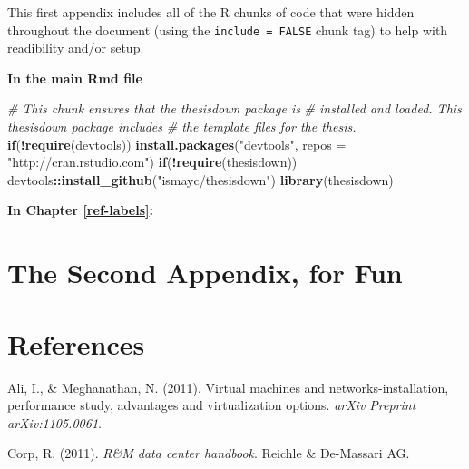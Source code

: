 \documentclass[12pt,twoside]{reedthesis}
\newenvironment{Shaded}{\begin{snugshade}}{\end{snugshade}}
\newcommand{\CommentTok}[1]{\textcolor[rgb]{0.56,0.35,0.01}{\textit{#1}}}
\newcommand{\ControlFlowTok}[1]{\textcolor[rgb]{0.13,0.29,0.53}{\textbf{#1}}}
\newcommand{\DataTypeTok}[1]{\textcolor[rgb]{0.13,0.29,0.53}{#1}}
\newcommand{\KeywordTok}[1]{\textcolor[rgb]{0.13,0.29,0.53}{\textbf{#1}}}
\newcommand{\NormalTok}[1]{#1}
\newcommand{\OperatorTok}[1]{\textcolor[rgb]{0.81,0.36,0.00}{\textbf{#1}}}
\newcommand{\StringTok}[1]{\textcolor[rgb]{0.31,0.60,0.02}{#1}}
\begin{document}
This first appendix includes all of the R chunks of code that were hidden throughout the document (using the \texttt{include\ =\ FALSE} chunk tag) to help with readibility and/or setup.

\textbf{In the main Rmd file}
\begin{Shaded}
\begin{Highlighting}[]
\CommentTok{# This chunk ensures that the thesisdown package is}
\CommentTok{# installed and loaded. This thesisdown package includes}
\CommentTok{# the template files for the thesis.}
\ControlFlowTok{if}\NormalTok{(}\OperatorTok{!}\KeywordTok{require}\NormalTok{(devtools))}
  \KeywordTok{install.packages}\NormalTok{(}\StringTok{"devtools"}\NormalTok{, }\DataTypeTok{repos =} \StringTok{"http://cran.rstudio.com"}\NormalTok{)}
\ControlFlowTok{if}\NormalTok{(}\OperatorTok{!}\KeywordTok{require}\NormalTok{(thesisdown))}
\NormalTok{  devtools}\OperatorTok{::}\KeywordTok{install_github}\NormalTok{(}\StringTok{"ismayc/thesisdown"}\NormalTok{)}
\KeywordTok{library}\NormalTok{(thesisdown)}
\end{Highlighting}
\end{Shaded}
\textbf{In Chapter \ref{ref-labels}:}

\hypertarget{the-second-appendix-for-fun}{%
\chapter{The Second Appendix, for Fun}\label{the-second-appendix-for-fun}}

\backmatter

\hypertarget{references}{%
\chapter*{References}\label{references}}


\noindent

\setlength{\parindent}{-0.20in}
\setlength{\leftskip}{0.20in}
\setlength{\parskip}{8pt}

\hypertarget{refs}{}
\leavevmode\hypertarget{ref-Cap3_2_mT}{}%
Ali, I., \& Meghanathan, N. (2011). Virtual machines and networks-installation, performance study, advantages and virtualization options. \emph{arXiv Preprint arXiv:1105.0061}.

\leavevmode\hypertarget{ref-Cap1_4_PdP}{}%
Corp, R. (2011). \emph{R\&M data center handbook}. Reichle \& De-Massari AG.
\end{document}
